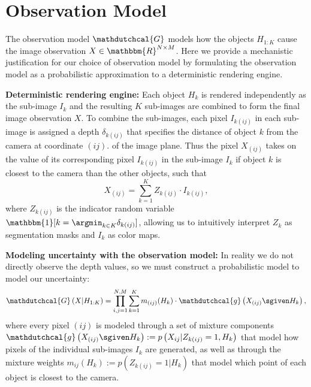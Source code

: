 \appendix
\setlength{\abovedisplayskip}{2pt}
\setlength{\belowdisplayskip}{2pt}

\section{Observation Model} \label{appdx:obs_model}
The observation model $\mathdutchcal{G}$ models how the objects $H_{1:K}$ cause the image observation $X \in \mathbbm{R}^{N \times M}$.
Here we provide a mechanistic justification for our choice of observation model by formulating the observation model as a probabilistic approximation to a deterministic rendering engine.

\textbf{Deterministic rendering engine:} Each object $H_k$ is rendered independently as the sub-image $I_k$ and the resulting $K$ sub-images are combined to form the final image observation $X$. To combine the sub-images, each pixel $I_{k(ij)}$ in each sub-image is assigned a depth $\delta_{k(ij)}$ that specifies the distance of object $k$ from the camera at coordinate $(ij)$. of the image plane. Thus the pixel $X_{(ij)}$ takes on the value of its corresponding pixel $I_{k(ij)}$ in the sub-image $I_k$ if object $k$ is closest to the camera than the other objects, such that
\footnotesize
\begin{equation}
    X_{(ij)} = \sum_{k=1}^K Z_{k(ij)} \cdot I_{k(ij)},
\end{equation}
\normalsize
where $Z_{k(ij)}$ is the indicator random variable $\mathbbm{1}[k = \argmin_{k \in K} \delta_{k(ij)}]$, allowing us to intuitively interpret $Z_{k}$ as segmentation masks and $I_{k}$ as color maps.

\textbf{Modeling uncertainty with the observation model:}
In reality we do not directly observe the depth values, so we must construct a probabilistic model to model our uncertainty:
\footnotesize
\begin{equation} \label{eqn:qppdx:obs_model}
    \mathdutchcal{G}\left(X| H_{1:K}\right) = \prod_{i,j=1}^{N,M} \sum_{k=1}^K m_{(ij)}(H_k) \cdot \mathdutchcal{g}\left(X_{(ij)} \sgiven H_k\right),
\end{equation}
\normalsize
where every pixel $(ij)$ is modeled through a set of mixture components \mbox{$\mathdutchcal{g}\left(X_{(ij)} \sgiven H_k\right) := p\left(X_{ij} | Z_{k(ij)}=1, H_k\right)$} that model how pixels of the individual sub-images $I_k$ are generated,
as well as through the mixture weights $m_{ij}(H_k):= p\left(Z_{k(ij)}=1| H_k\right)$ that model which point of each object is closest to the camera.

